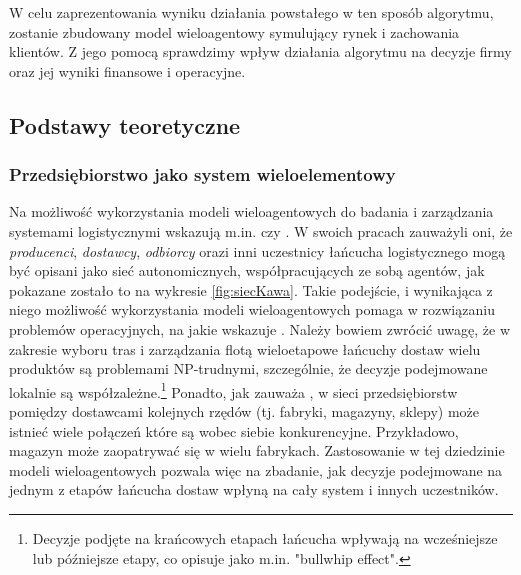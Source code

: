 \documentclass[polish, twoside, 12pt, a4paper]{article}
\theoremstyle{definition}
\theoremstyle{plain}
\theoremstyle{remark}
\begin{document}
W celu zaprezentowania wyniku działania powstałego w ten sposób algorytmu, zostanie zbudowany model wieloagentowy symulujący rynek i zachowania klientów. Z jego pomocą sprawdzimy wpływ działania algorytmu na decyzje firmy oraz jej wyniki finansowe i operacyjne.

\subsection{Podstawy teoretyczne} \label{chapter:teoria}
\subsubsection{Przedsiębiorstwo jako system wieloelementowy} 
Na możliwość wykorzystania modeli wieloagentowych do badania i zarządzania systemami logistycznymi wskazują m.in. \cite{Moyaux2006} czy \cite{Kawa2010}. W swoich pracach zauważyli oni, że  \textit{producenci},  \textit{dostawcy},  \textit{odbiorcy} orazi inni uczestnicy łańcucha logistycznego mogą być opisani jako sieć autonomicznych, współpracujących ze sobą agentów, jak pokazane zostało to na wykresie \ref{fig:siecKawa}. Takie podejście, i wynikająca z niego możliwość wykorzystania modeli wieloagentowych pomaga w rozwiązaniu problemów operacyjnych, na jakie wskazuje \cite{Kawa2010}. Należy bowiem zwrócić uwagę, że w zakresie wyboru tras i zarządzania flotą wieloetapowe łańcuchy dostaw wielu produktów są problemami NP-trudnymi, szczególnie, że decyzje podejmowane lokalnie są współzależne.\footnote{Decyzje podjęte na krańcowych etapach łańcucha wpływają na wcześniejsze lub późniejsze etapy, co \cite{Moyaux2006} opisuje jako m.in. "bullwhip effect".} Ponadto, jak zauważa \cite{Kawa2010}, w sieci przedsiębiorstw pomiędzy dostawcami kolejnych rzędów (tj. fabryki, magazyny, sklepy) może istnieć wiele połączeń które są wobec siebie konkurencyjne. Przykładowo, magazyn może zaopatrywać się w wielu fabrykach. Zastosowanie w tej dziedzinie modeli wieloagentowych pozwala więc na zbadanie, jak decyzje podejmowane na jednym z etapów łańcucha dostaw wpłyną na cały system i innych uczestników.  
\end{document}
